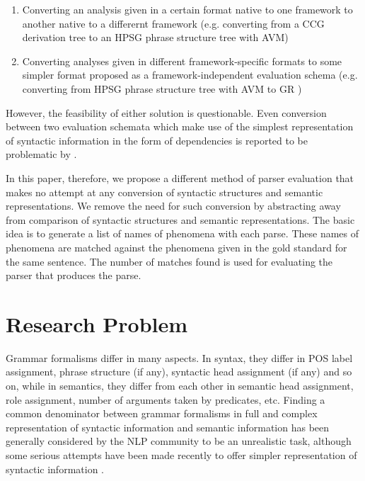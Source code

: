 \documentclass[11pt]{article}
\begin{document}
\begin{enumerate}
\item Converting an analysis given in a certain format native to one framework to another native to a differernt framework (e.g. converting from a CCG \cite{steedman2000} derivation tree to an HPSG \cite{pollardandsag1994} phrase structure tree with AVM)
\item Converting analyses given in different framework-specific formats to some simpler format proposed as a framework-independent evaluation schema  (e.g. converting from HPSG phrase structure tree with AVM to GR \cite{briscodandcarrollandwatson2006})
\end{enumerate}

However, the feasibility of either solution is questionable. Even conversion between two evaluation schemata which make use of the simplest representation of syntactic information in the form of dependencies is reported to be problematic by \cite{miyaoandsagaeandtsujii2007}. 

In this paper, therefore, we propose a different method of parser evaluation that makes no attempt at any conversion of syntactic structures and semantic representations. We remove the need for such conversion by abstracting away from  comparison of syntactic structures and semantic representations. The basic idea is to generate a list of names of phenomena with each parse. These names of phenomena are matched against the phenomena given in the gold standard for the same sentence. The number of matches found is used for evaluating the parser that produces the parse.

\section{Research Problem}

Grammar formalisms differ in many aspects. In syntax, they differ in POS label assignment, phrase structure (if any), syntactic head assignment (if any) and so on, while in semantics, they differ from each other in semantic head assignment, role assignment, number of arguments taken by predicates, etc. Finding a common denominator between grammar formalisms in full and complex representation of syntactic information and semantic information has been generally considered by the NLP community to be an unrealistic task, although some serious attempts have been made recently to offer simpler representation of syntactic information \cite{briscodandcarrollandwatson2006,demarneffeandmaccartneyandmanning2006}. 
 
\end{document}
